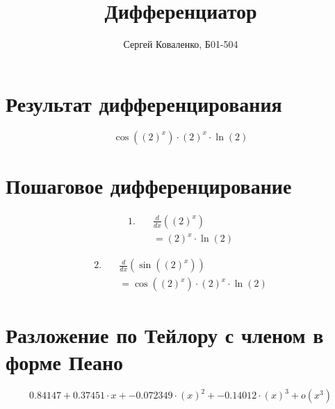 \documentclass[a4paper,12pt]{article}
\title{Дифференциатор}
\author{Сергей Коваленко, Б01-504}
\begin{document}
\maketitle

\newpage

\section{Результат дифференцирования}

\[
{\cos\left(\left(2\right)^{x}\right)}\cdot{{\left(2\right)^{x}}\cdot{\ln\left(2\right)}}
\]

\section{Пошаговое дифференцирование}

\[
\begin{aligned}
1.\quad &\frac{d}{dx}\left(\left(2\right)^{x}\right) \\
&= {\left(2\right)^{x}}\cdot{\ln\left(2\right)}
\end{aligned}
\]

\[
\begin{aligned}
2.\quad &\frac{d}{dx}\left(\sin\left(\left(2\right)^{x}\right)\right) \\
&= {\cos\left(\left(2\right)^{x}\right)}\cdot{{\left(2\right)^{x}}\cdot{\ln\left(2\right)}}
\end{aligned}
\]

\section{Разложение по Тейлору с членом в форме Пеано}
\[
{{{{0.84147 + {0.37451}\cdot{x}} + {-0.072349}\cdot{\left(x\right)^{2}}} + {-0.14012}\cdot{\left(x\right)^{3}}} + o\left(x^{3}\right)}
\]
\end{document}
